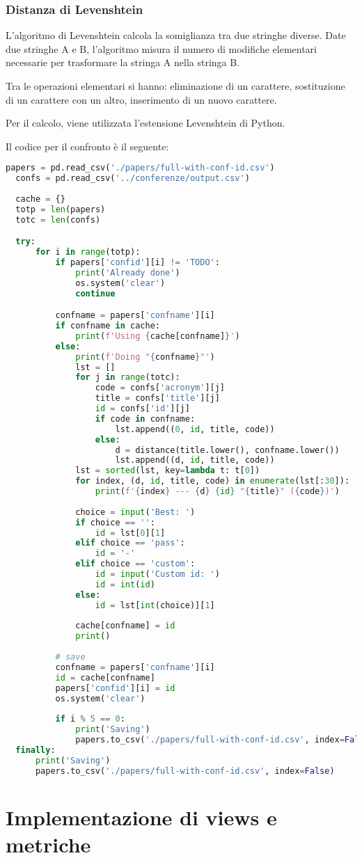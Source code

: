 \subsubsection{Distanza di Levenshtein}
L'algoritmo di Levenshtein calcola la somiglianza tra due stringhe diverse. Date due stringhe A e B, l'algoritmo misura il numero di modifiche elementari necessarie 
per trasformare la stringa A nella stringa B. 

Tra le operazioni elementari si hanno: eliminazione di un carattere, sostituzione di un carattere con un altro, inserimento di un nuovo carattere.

Per il calcolo, viene utilizzata l'estensione Levenshtein di Python.

Il codice per il confronto è il seguente:

\begin{lstlisting}[language=Python]
  papers = pd.read_csv('./papers/full-with-conf-id.csv')
  confs = pd.read_csv('../conferenze/output.csv')
  
  cache = {}
  totp = len(papers)
  totc = len(confs)

  try:
      for i in range(totp):
          if papers['confid'][i] != 'TODO':
              print('Already done')
              os.system('clear')
              continue

          confname = papers['confname'][i]
          if confname in cache:
              print(f'Using {cache[confname]}')
          else:
              print(f'Doing "{confname}"')
              lst = []
              for j in range(totc):
                  code = confs['acronym'][j]
                  title = confs['title'][j]
                  id = confs['id'][j]
                  if code in confname:
                      lst.append((0, id, title, code))
                  else:
                      d = distance(title.lower(), confname.lower())
                      lst.append((d, id, title, code))
              lst = sorted(lst, key=lambda t: t[0])
              for index, (d, id, title, code) in enumerate(lst[:30]):
                  print(f'{index} --- {d} {id} "{title}" ({code})')
  
              choice = input('Best: ')
              if choice == '':
                  id = lst[0][1]
              elif choice == 'pass':
                  id = '-'
              elif choice == 'custom':
                  id = input('Custom id: ')
                  id = int(id)
              else:
                  id = lst[int(choice)][1]
  
              cache[confname] = id
              print()
  
          # save
          confname = papers['confname'][i]
          id = cache[confname]
          papers['confid'][i] = id
          os.system('clear')
  
          if i % 5 == 0:
              print('Saving')
              papers.to_csv('./papers/full-with-conf-id.csv', index=False)
  finally:
      print('Saving')
      papers.to_csv('./papers/full-with-conf-id.csv', index=False)
\end{lstlisting}



\section{Implementazione di views e metriche}


